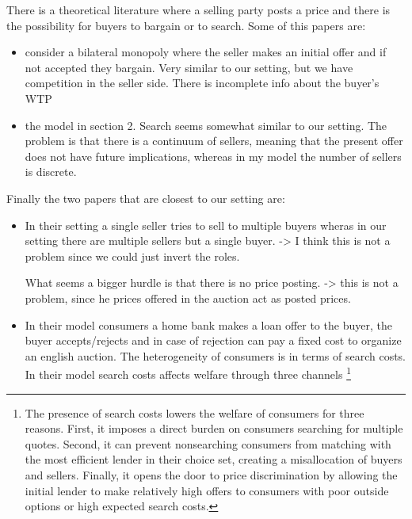 \documentclass[12pt]{article}
\theoremstyle{plain}
\theoremstyle{plain}
\begin{document}
There is a theoretical literature where a selling party posts a price and there is the possibility for buyers to bargain or to search. Some of this papers are: 
\begin{itemize}
    \item \textcite{sobel_multistage_1983} consider a bilateral monopoly where the seller makes an initial offer and if not accepted they bargain. Very similar to our setting, but we have competition in the seller side. There is incomplete info about the buyer's WTP

    \item \textcite{board_outside_2014} the model in section 2. Search seems somewhat similar to our setting. The problem is that there is a continuum of sellers, meaning that the present offer does not have future implications, whereas in my model the number of sellers is discrete.
\end{itemize}

Finally the two papers that are closest to our setting are: 
\begin{itemize}
    \item \textcite{larsen_efficiency_2021} In their setting a single seller tries to sell to multiple buyers wheras in our setting there are multiple sellers but a single buyer. -> I think this is not a problem since we could just invert the roles.

What seems a bigger hurdle is that there is no price posting. -> this is not a problem, since he prices offered in the auction act as posted prices.

    \item \textcite{allen_search_2019} In their model consumers a home bank makes a loan offer to the buyer, the buyer accepts/rejects and in case of rejection can pay a fixed cost to organize an english auction. The heterogeneity of consumers is in terms of search costs. In their model search costs affects welfare through three channels \footnote{The presence of search costs lowers the welfare of consumers for three reasons. First, it imposes a direct burden on consumers searching for multiple quotes. Second, it can prevent nonsearching consumers from matching with the most efficient lender in their choice set, creating a misallocation of buyers and sellers. Finally, it opens the door to price discrimination by allowing the initial lender to make relatively high offers to consumers with poor outside options or high expected search costs.}
\end{itemize}
\end{document}

